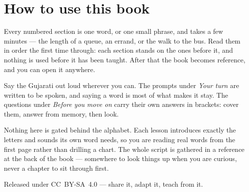 \documentclass[11pt,twoside]{book}
\begin{document}
\section*{How to use this book}

Every numbered section is one word, or one small phrase, and takes a few
minutes --- the length of a queue, an errand, or the walk to the bus. Read them
in order the first time through: each section stands on the ones before it, and
nothing is used before it has been taught. After that the book becomes
reference, and you can open it anywhere.

Say the Gujarati out loud wherever you can. The prompts under \emph{Your turn}
are written to be spoken, and saying a word is most of what makes it stay. The
questions under \emph{Before you move on} carry their own answers in brackets:
cover them, answer from memory, then look.

Nothing here is gated behind the alphabet. Each lesson introduces exactly the
letters and sounds its own word needs, so you are reading real words from the
first page rather than drilling a chart. The whole script is gathered in a
reference at the back of the book --- somewhere to look things up when you are
curious, never a chapter to sit through first.

Released under CC~BY-SA~4.0 --- share it, adapt it, teach from it.

\tableofcontents

\mainmatter


\end{document}
